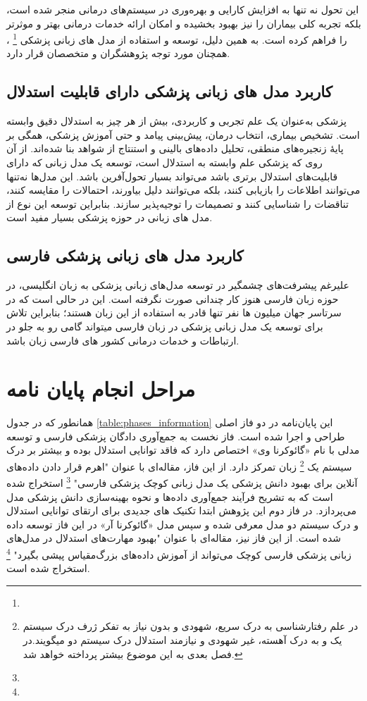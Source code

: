 این تحول نه تنها به افزایش کارایی و بهره‌وری در سیستم‌های درمانی منجر شده است، بلکه تجربه کلی بیماران را نیز بهبود بخشیده و امکان ارائه خدمات درمانی بهتر و موثرتر را فراهم کرده است. به همین دلیل، توسعه و استفاده از مدل های زبانی پزشکی
\footnote{}
، همچنان مورد توجه پژوهشگران و متخصصان قرار دارد.

\subsection{کاربرد مدل های زبانی پزشکی دارای قابلیت استدلال}
پزشکی به‌عنوان یک علم تجربی و کاربردی، بیش از هر چیز به استدلال دقیق وابسته است. تشخیص بیماری، انتخاب درمان، پیش‌بینی پیامد و حتی آموزش پزشکی، همگی بر پایهٔ زنجیره‌های منطقی، تحلیل داده‌های بالینی و استنتاج از شواهد بنا شده‌اند. از آن روی که پزشکی علم وابسته به استدلال است، توسعه یک مدل زبانی که دارای قابلیت‌های استدلال برتری باشد می‌تواند بسیار تحول‌آفرین باشد. این مدل‌ها نه‌تنها می‌توانند اطلاعات را بازیابی کنند، بلکه می‌توانند دلیل بیاورند، احتمالات را مقایسه کنند، تناقضات را شناسایی کنند و تصمیمات را توجیه‌پذیر سازند. بنابراین توسعه این نوع از مدل های زبانی در حوزه پزشکی بسیار مفید است.
\cite{b4}
\subsection{کاربرد مدل های زبانی پزشکی فارسی}
علیرغم پیشرفت‌های چشمگیر در توسعه مدل‌های زبانی پزشکی به زبان انگلیسی، در حوزه زبان فارسی هنوز کار چندانی صورت نگرفته است. این در حالی است که در سرتاسر جهان میلیون ها نفر تنها قادر به استفاده از این زبان هستند؛
بنابراین تلاش برای توسعه یک مدل زبانی پزشکی در زبان فارسی میتواند گامی رو به جلو در ارتباطات و خدمات درمانی کشور های فارسی زبان باشد. 
\section{مراحل انجام پایان نامه}
همانطور که در جدول 
\ref{table:phases_information}
این پایان‌نامه در دو فاز اصلی طراحی و اجرا شده است. فاز نخست به جمع‌آوری دادگان پزشکی فارسی و توسعه مدلی با نام «گائوکرنا وی» اختصاص دارد که فاقد توانایی استدلال بوده و بیشتر بر درک سیستم یک 
\footnote{
در علم رفتارشناسی به درک سریع، شهودی و بدون نیاز به تفکر ژرف درک سیستم یک و به درک آهسته، غیر شهودی و نیازمند استدلال درک سیستم دو میگویند.در فصل بعدی به این موضوع بیشتر پرداخته خواهد شد.
}
زبان تمرکز دارد. از این فاز، مقاله‌ای با عنوان "اهرم قرار دادن داده‌های آنلاین برای بهبود دانش پزشکی یک مدل زبانی کوچک پزشکی فارسی" 
\footnote{}
استخراج شده است که به تشریح فرآیند جمع‌آوری داده‌ها و نحوه بهینه‌سازی دانش پزشکی مدل می‌پردازد. در فاز دوم این پژوهش ابتدا تکنیک های جدیدی برای ارتقای توانایی استدلال و درک سیستم دو مدل معرفی شده و سپس مدل «گائوکرنا آر» در این فاز توسعه داده شده است.
از این فاز نیز، مقاله‌ای با عنوان "بهبود مهارت‌های استدلال در مدل‌های زبانی پزشکی فارسی کوچک می‌تواند از آموزش داده‌های بزرگ‌مقیاس پیشی بگیرد"
\footnote{}
استخراج شده است.

